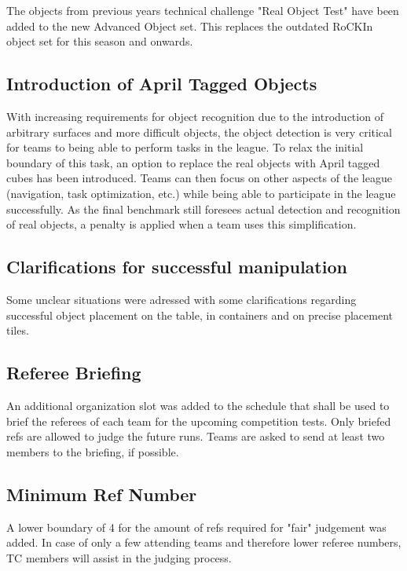 The objects from previous years technical challenge "Real Object Test" have been added to the new Advanced Object set. This replaces the outdated RoCKIn object set for this season and onwards.

\subsection{Introduction of April Tagged Objects}

With increasing requirements for object recognition due to the introduction of arbitrary surfaces and more difficult objects, the object detection is very critical for teams to being able to perform tasks in the league. To relax the initial boundary of this task, an option to replace the real objects with April tagged cubes has been introduced. Teams can then focus on other aspects of the league (navigation, task optimization, etc.) while being able to participate in the league successfully. As the final benchmark still foresees actual detection and recognition of real objects, a penalty is applied when a team uses this simplification.

\subsection{Clarifications for successful manipulation}

Some unclear situations were adressed with some clarifications regarding successful object placement on the table, in containers and on precise placement tiles.

\subsection{Referee Briefing}

An additional organization slot was added to the schedule that shall be used to brief the referees of each team for the upcoming competition tests. Only briefed refs are allowed to judge the future runs.
Teams are asked to send at least two members to the briefing, if possible.

\subsection{Minimum Ref Number}

A lower boundary of 4 for the amount of refs required for "fair" judgement was added.
In case of only a few attending teams and therefore lower referee numbers,
TC members will assist in the judging process.

